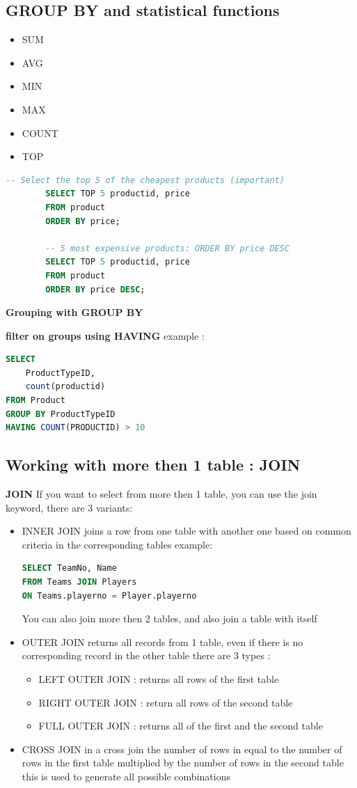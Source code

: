 \documentclass{report}
\begin{document}
	\subsection{GROUP BY and statistical functions}
	\begin{itemize}
		\item SUM
		\item AVG
		\item MIN 
		\item MAX
		\item COUNT
		\item TOP
	\end{itemize}

   \begin{lstlisting}[language=SQL]
		-- Select the top 5 of the cheapest products (important)
		SELECT TOP 5 productid, price
		FROM product
		ORDER BY price;

		-- 5 most expensive products: ORDER BY price DESC
		SELECT TOP 5 productid, price
		FROM product
		ORDER BY price DESC;
   \end{lstlisting}
	
	\textbf{Grouping with GROUP BY}
	
	\textbf{filter on groups using HAVING}
	example : 
	\begin{lstlisting}[language=SQL]
SELECT
	ProductTypeID,
	count(productid)
FROM Product
GROUP BY ProductTypeID
HAVING COUNT(PRODUCTID) > 10\end{lstlisting}
	\subsection{Working with more then 1 table : JOIN}
	\textbf{JOIN}
	If you want to select from more then 1 table, you can use the join keyword, there are 3 variants: 
	\begin{itemize}
		\item INNER JOIN
		\subitem joins a row from one table with another one based on common criteria in the corresponding tables
		example: 
		\begin{lstlisting}[language=SQL]
SELECT TeamNo, Name
FROM Teams JOIN Players
ON Teams.playerno = Player.playerno\end{lstlisting}
		\subitem You can also join more then 2 tables, and also join a table with itself
		\item OUTER JOIN
		\subitem returns all records from 1 table, even if there is no corresponding record in the other table
		\subitem there are 3 types : 
		\begin{itemize}
			\item LEFT OUTER JOIN : returns all rows of the first table
			\item RIGHT OUTER JOIN  : return all rows of the second table
			\item FULL OUTER JOIN  : returns all of the first and the second table 
		\end{itemize}
		\item CROSS JOIN 
		\subitem in a cross join the number of rows in equal to the number of rows in the first table multiplied by the number of rows in the second table
		\subitem this is used to generate all possible combinations
	\end{itemize}
\end{document}
